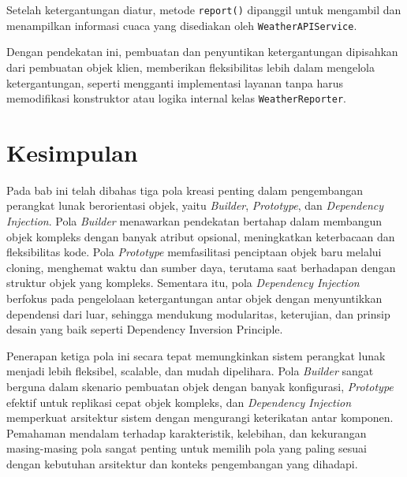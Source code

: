 Setelah ketergantungan diatur, metode \texttt{report()} dipanggil untuk mengambil dan menampilkan informasi cuaca yang disediakan oleh \texttt{WeatherAPIService}. 

Dengan pendekatan ini, pembuatan dan penyuntikan ketergantungan dipisahkan dari pembuatan objek klien, memberikan fleksibilitas lebih dalam mengelola ketergantungan, seperti mengganti implementasi layanan tanpa harus memodifikasi konstruktor atau logika internal kelas \texttt{WeatherReporter}.


\section{Kesimpulan}

Pada bab ini telah dibahas tiga pola kreasi penting dalam pengembangan perangkat lunak berorientasi objek, yaitu \textit{Builder}, \textit{Prototype}, dan \textit{Dependency Injection}. Pola \textit{Builder} menawarkan pendekatan bertahap dalam membangun objek kompleks dengan banyak atribut opsional, meningkatkan keterbacaan dan fleksibilitas kode. Pola \textit{Prototype} memfasilitasi penciptaan objek baru melalui cloning, menghemat waktu dan sumber daya, terutama saat berhadapan dengan struktur objek yang kompleks. Sementara itu, pola \textit{Dependency Injection} berfokus pada pengelolaan ketergantungan antar objek dengan menyuntikkan dependensi dari luar, sehingga mendukung modularitas, keterujian, dan prinsip desain yang baik seperti Dependency Inversion Principle.

Penerapan ketiga pola ini secara tepat memungkinkan sistem perangkat lunak menjadi lebih fleksibel, scalable, dan mudah dipelihara. Pola \textit{Builder} sangat berguna dalam skenario pembuatan objek dengan banyak konfigurasi, \textit{Prototype} efektif untuk replikasi cepat objek kompleks, dan \textit{Dependency Injection} memperkuat arsitektur sistem dengan mengurangi keterikatan antar komponen. Pemahaman mendalam terhadap karakteristik, kelebihan, dan kekurangan masing-masing pola sangat penting untuk memilih pola yang paling sesuai dengan kebutuhan arsitektur dan konteks pengembangan yang dihadapi.
